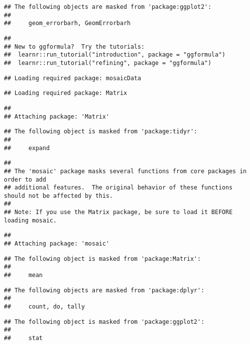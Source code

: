 \documentclass[]{article}
\begin{document}
\begin{verbatim}
## The following objects are masked from 'package:ggplot2':
## 
##     geom_errorbarh, GeomErrorbarh
\end{verbatim}

\begin{verbatim}
## 
## New to ggformula?  Try the tutorials: 
##  learnr::run_tutorial("introduction", package = "ggformula")
##  learnr::run_tutorial("refining", package = "ggformula")
\end{verbatim}

\begin{verbatim}
## Loading required package: mosaicData
\end{verbatim}

\begin{verbatim}
## Loading required package: Matrix
\end{verbatim}

\begin{verbatim}
## 
## Attaching package: 'Matrix'
\end{verbatim}

\begin{verbatim}
## The following object is masked from 'package:tidyr':
## 
##     expand
\end{verbatim}

\begin{verbatim}
## 
## The 'mosaic' package masks several functions from core packages in order to add 
## additional features.  The original behavior of these functions should not be affected by this.
## 
## Note: If you use the Matrix package, be sure to load it BEFORE loading mosaic.
\end{verbatim}

\begin{verbatim}
## 
## Attaching package: 'mosaic'
\end{verbatim}

\begin{verbatim}
## The following object is masked from 'package:Matrix':
## 
##     mean
\end{verbatim}

\begin{verbatim}
## The following objects are masked from 'package:dplyr':
## 
##     count, do, tally
\end{verbatim}

\begin{verbatim}
## The following object is masked from 'package:ggplot2':
## 
##     stat
\end{verbatim}
\end{document}

